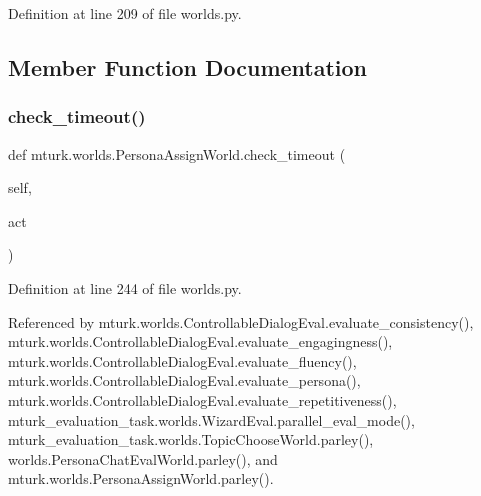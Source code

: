 Definition at line 209 of file worlds.\+py.



\subsection{Member Function Documentation}
\mbox{\label{classmturk_1_1worlds_1_1PersonaAssignWorld_a5039d4c0de8884794bee9b2683d43055}} 
\subsubsection{\texorpdfstring{check\+\_\+timeout()}{check\_timeout()}}
{\footnotesize\ttfamily def mturk.\+worlds.\+Persona\+Assign\+World.\+check\+\_\+timeout (\begin{DoxyParamCaption}\item[{}]{self,  }\item[{}]{act }\end{DoxyParamCaption})}



Definition at line 244 of file worlds.\+py.



Referenced by mturk.\+worlds.\+Controllable\+Dialog\+Eval.\+evaluate\+\_\+consistency(), mturk.\+worlds.\+Controllable\+Dialog\+Eval.\+evaluate\+\_\+engagingness(), mturk.\+worlds.\+Controllable\+Dialog\+Eval.\+evaluate\+\_\+fluency(), mturk.\+worlds.\+Controllable\+Dialog\+Eval.\+evaluate\+\_\+persona(), mturk.\+worlds.\+Controllable\+Dialog\+Eval.\+evaluate\+\_\+repetitiveness(), mturk\+\_\+evaluation\+\_\+task.\+worlds.\+Wizard\+Eval.\+parallel\+\_\+eval\+\_\+mode(), mturk\+\_\+evaluation\+\_\+task.\+worlds.\+Topic\+Choose\+World.\+parley(), worlds.\+Persona\+Chat\+Eval\+World.\+parley(), and mturk.\+worlds.\+Persona\+Assign\+World.\+parley().

